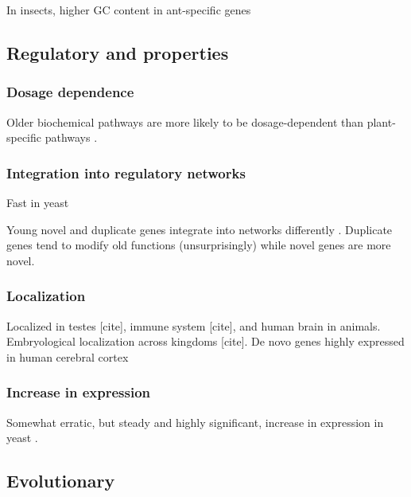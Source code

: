     In insects, higher GC content in ant-specific genes
    \cite{wissler_mechanisms_2013}


\subsection{Regulatory and properties}

  \subsubsection{Dosage dependence}

  Older biochemical pathways are more likely to be dosage-dependent than
  plant-specific pathways \cite{shi_genome-wide_2015}.

  \subsubsection{Integration into regulatory networks}

  Fast in yeast \cite{abrusan_integration_2013}

  \FloatBarrier

  Young novel and duplicate genes integrate into networks differently
  \cite{capra_novel_2010}. Duplicate genes tend to modify old functions
  (unsurprisingly) while novel genes are more novel.

  \subsubsection{Localization}
        
  Localized in testes [cite], immune system [cite], and human
  brain \cite{li_human-specific_2010} in animals.
  Embryological localization across kingdoms [cite].  De novo
  genes highly expressed in human cerebral cortex
  \cite{wu_novo_2011}

  \subsubsection{Increase in expression}

  
  Somewhat erratic, but steady and highly significant, increase in
  expression in yeast \cite{carvunis_proto-genes_2012}.

\subsection{Evolutionary}

